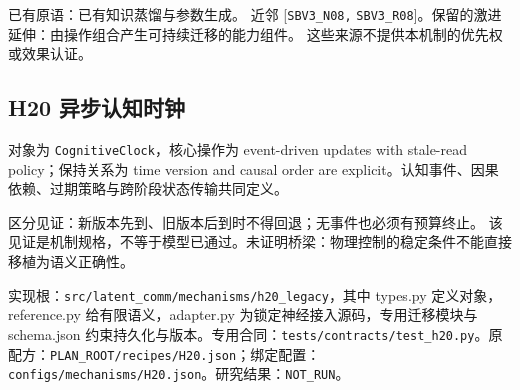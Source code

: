 \documentclass[
  10pt,
]{article}
\begin{document}
已有原语：已有知识蒸馏与参数生成。 近邻 {[}\nolinkurl{SBV3_N08,}
\nolinkurl{SBV3_R08}{]}。保留的激进延伸：由操作组合产生可持续迁移的能力组件。
这些来源不提供本机制的优先权或效果认证。

\subsection{H20
异步认知时钟}\label{h20-ux5f02ux6b65ux8ba4ux77e5ux65f6ux949f}

对象为 \nolinkurl{CognitiveClock}，核心操作为 event-driven updates with
stale-read policy；保持关系为 time version and causal order are
explicit。认知事件、因果依赖、过期策略与跨阶段状态传输共同定义。

区分见证：新版本先到、旧版本后到时不得回退；无事件也必须有预算终止。
该见证是机制规格，不等于模型已通过。未证明桥梁：物理控制的稳定条件不能直接移植为语义正确性。

实现根：{\small\nolinkurl{src/latent_comm/mechanisms/h20_legacy}}，其中
types.py 定义对象，reference.py 给有限语义，adapter.py
为锁定神经接入源码，专用迁移模块与 schema.json
约束持久化与版本。专用合同：{\small\nolinkurl{tests/contracts/test_h20.py}}。原配方：{\small\nolinkurl{PLAN_ROOT/recipes/H20.json}}；绑定配置：{\small\nolinkurl{configs/mechanisms/H20.json}}。研究结果：\nolinkurl{NOT_RUN}。
\end{document}
